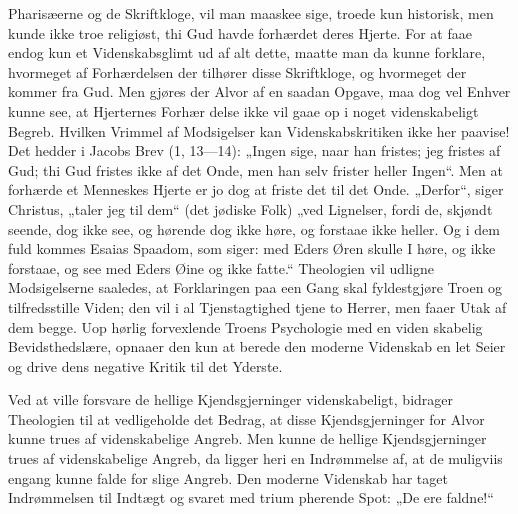 \documentclass[12pt]{book}
\newcommand{\opage}[1]{\marginnote{\footnotesize\textit{[#1]}}}
\begin{document}
Pharisæerne og de Skriftkloge, vil man maaskee
\opage{85}\setcounter{footnote}{0}%
sige, troede kun historisk, men kunde ikke troe religiøst,
thi Gud havde forhærdet deres Hjerte. For at faae
endog kun et Videnskabsglimt ud af alt dette, maatte
man da kunne forklare, hvormeget af Forhærdelsen
der tilhører disse Skriftkloge, og hvormeget der kommer
fra Gud. Men gjøres der Alvor af en saadan Opgave,
maa dog vel Enhver kunne see, at Hjerternes Forhær\-%
delse ikke vil gaae op i noget videnskabeligt Begreb.
Hvilken Vrimmel af Modsigelser kan Videnskabskritiken
ikke her paavise! Det hedder i Jacobs Brev (1, 13---14):
„Ingen sige, naar han fristes; jeg fristes af Gud; thi Gud
fristes ikke af det Onde, men han selv frister heller
Ingen“. Men at forhærde et Menneskes Hjerte er jo
dog at friste det til det Onde. „Derfor“, siger Christus,
„taler jeg til dem“ (det jødiske Folk) „ved Lignelser,
fordi de, skjøndt seende, dog ikke see, og hørende dog
ikke høre, og forstaae ikke heller. Og i dem fuld\-%
kommes Esaias Spaadom, som siger: med Eders Øren
skulle I høre, og ikke forstaae, og see med Eders Øine
og ikke fatte.“ Theologien vil udligne Modsigelserne
saaledes, at Forklaringen paa een Gang skal fyldestgjøre
Troen og tilfredsstille Viden; den vil i al Tjenstagtighed
tjene to Herrer, men faaer Utak af dem begge. Uop\-%
hørlig forvexlende Troens Psychologie med en viden\-%
skabelig Bevidsthedslære, opnaaer den kun at berede den
moderne Videnskab en let Seier og drive dens negative
Kritik til det Yderste.

Ved at ville forsvare de hellige Kjendsgjerninger
videnskabeligt, bidrager Theologien til at vedligeholde
det Bedrag, at disse Kjendsgjerninger for Alvor kunne
trues af videnskabelige Angreb. Men kunne de hellige
Kjendsgjerninger trues af videnskabelige Angreb, da
ligger heri en Indrømmelse af, at de muligviis engang
kunne falde for slige Angreb. Den moderne Videnskab
\opage{86}\setcounter{footnote}{0}%
har taget Indrømmelsen til Indtægt og svaret med trium\-%
pherende Spot: „De ere faldne!“
\end{document}
